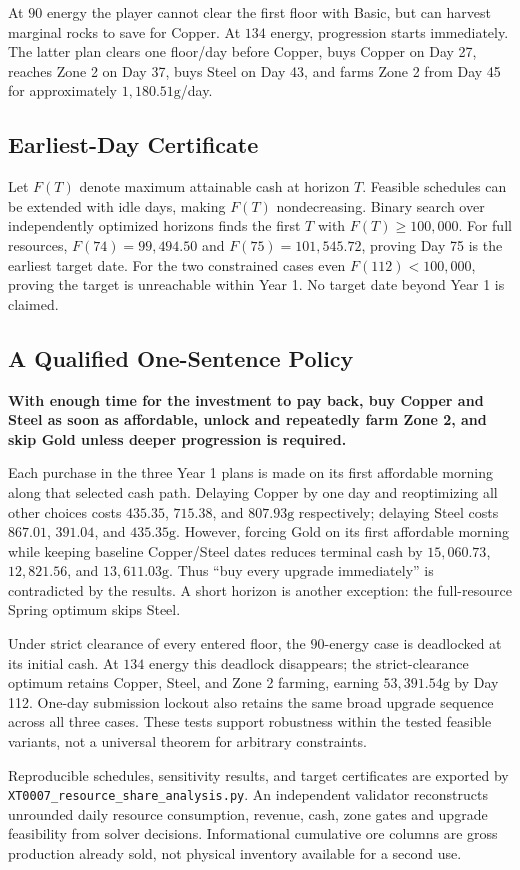 \documentclass[11pt,a4paper]{article}
\begin{document}
At $90$ energy the player cannot clear the first floor with Basic, but can harvest marginal rocks to save for Copper. At $134$ energy, progression starts immediately. The latter plan clears one floor/day before Copper, buys Copper on Day 27, reaches Zone 2 on Day 37, buys Steel on Day 43, and farms Zone 2 from Day 45 for approximately $1{,}180.51\mathrm{g}$/day.

\subsection{Earliest-Day Certificate}
Let $F(T)$ denote maximum attainable cash at horizon $T$. Feasible schedules can be extended with idle days, making $F(T)$ nondecreasing. Binary search over independently optimized horizons finds the first $T$ with $F(T)\ge100{,}000$. For full resources, $F(74)=99{,}494.50$ and $F(75)=101{,}545.72$, proving Day 75 is the earliest target date. For the two constrained cases even $F(112)<100{,}000$, proving the target is unreachable within Year 1. No target date beyond Year 1 is claimed.

\subsection{A Qualified One-Sentence Policy}
\textbf{With enough time for the investment to pay back, buy Copper and Steel as soon as affordable, unlock and repeatedly farm Zone 2, and skip Gold unless deeper progression is required.}

Each purchase in the three Year 1 plans is made on its first affordable morning along that selected cash path. Delaying Copper by one day and reoptimizing all other choices costs $435.35$, $715.38$, and $807.93\mathrm{g}$ respectively; delaying Steel costs $867.01$, $391.04$, and $435.35\mathrm{g}$. However, forcing Gold on its first affordable morning while keeping baseline Copper/Steel dates reduces terminal cash by $15{,}060.73$, $12{,}821.56$, and $13{,}611.03\mathrm{g}$. Thus ``buy every upgrade immediately'' is contradicted by the results. A short horizon is another exception: the full-resource Spring optimum skips Steel.

Under strict clearance of every entered floor, the $90$-energy case is deadlocked at its initial cash. At $134$ energy this deadlock disappears; the strict-clearance optimum retains Copper, Steel, and Zone 2 farming, earning $53{,}391.54\mathrm{g}$ by Day 112. One-day submission lockout also retains the same broad upgrade sequence across all three cases. These tests support robustness within the tested feasible variants, not a universal theorem for arbitrary constraints.

Reproducible schedules, sensitivity results, and target certificates are exported by \texttt{XT0007\_resource\_share\_analysis.py}. An independent validator reconstructs unrounded daily resource consumption, revenue, cash, zone gates and upgrade feasibility from solver decisions. Informational cumulative ore columns are gross production already sold, not physical inventory available for a second use.
\end{document}
